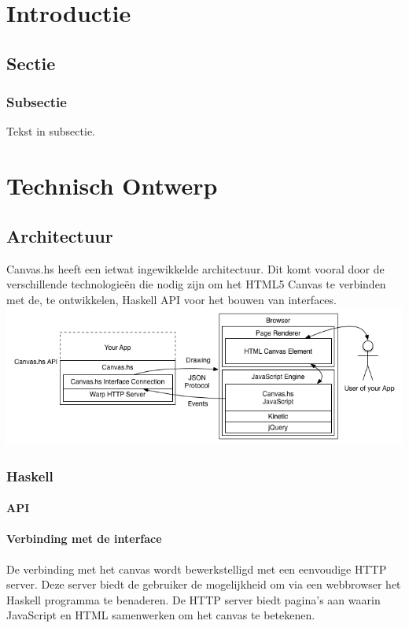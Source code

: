 \documentclass[a4paper]{report}
\begin{document}


\chapter{Introductie}
\section{Sectie}
\subsection{Subsectie}
Tekst in subsectie.

\chapter{Technisch Ontwerp}
\section{Architectuur}
Canvas.hs heeft een ietwat ingewikkelde architectuur. Dit komt vooral door de verschillende technologieën die nodig zijn om het HTML5 Canvas te verbinden met de, te ontwikkelen, Haskell API voor het bouwen van interfaces.
\includegraphics{architecture.png}
\subsection{Haskell}

\subsubsection{API}
\subsubsection{Verbinding met de interface}
De verbinding met het canvas wordt bewerkstelligd met een eenvoudige HTTP server. Deze server biedt de gebruiker de mogelijkheid om via een webbrowser het Haskell programma te benaderen. De HTTP server biedt pagina's aan waarin JavaScript en HTML samenwerken om het canvas te betekenen.
\end{document}
